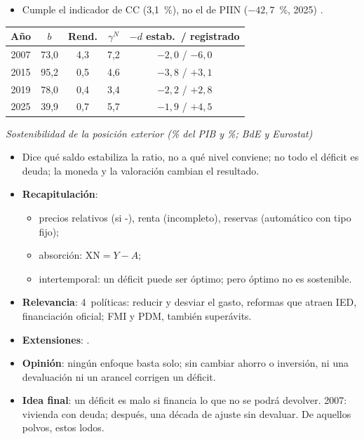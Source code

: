 \documentclass{article}
\begin{document}
\begin{columnas}
\begin{itemize}
\item Cumple el indicador de CC (3,1~\%), no el de PIIN ($-42{,}7$~\%, 2025)  .
\end{itemize}
{\centering\small
\begin{tabular}{@{}ccccc@{}}
\toprule
Año & $b$ & Rend. & $\gamma^N$ & $-d$ estab.\ / registrado\\
\midrule
2007 & 73,0 & 4,3 & 7,2 & $-2{,}0$ / $-6{,}0$\\
2015 & 95,2 & 0,5 & 4,6 & $-3{,}8$ / $+3{,}1$\\
2019 & 78,0 & 0,4 & 3,4 & $-2{,}2$ / $+2{,}8$\\
2025 & 39,9 & 0,7 & 5,7 & $-1{,}9$ / $+4{,}5$\\
\bottomrule
\end{tabular}\par}
{\centering\footnotesize\color{tceegris}\itshape Sostenibilidad de la posición exterior (\% del PIB y \%; BdE y Eurostat)\par}
\begin{itemize}
\item Dice qué saldo estabiliza la ratio, no a qué nivel conviene; no todo el déficit es deuda; la moneda y la valoración cambian el resultado.
\end{itemize}

\begin{itemize}
\item \textbf{Recapitulación}:
  \begin{itemize}
  \item precios relativos (si -), renta (incompleto), reservas (automático con tipo fijo);
  \item absorción: $\mathrm{XN}=Y-A$;
  \item intertemporal: un déficit puede ser óptimo; pero óptimo no es sostenible.
  \end{itemize}
\item \textbf{Relevancia}: 4~políticas: reducir y desviar el gasto, reformas que atraen IED, financiación oficial; FMI y PDM, también superávits.
\item \textbf{Extensiones}:       .
\item \textbf{Opinión}: ningún enfoque basta solo; sin cambiar ahorro o inversión, ni una devaluación ni un arancel corrigen un déficit.
\item \textbf{Idea final}: un déficit es malo si financia lo que no se podrá devolver. 2007: vivienda con deuda; después, una década de ajuste sin devaluar. De aquellos polvos, estos lodos.
\end{itemize}


\end{columnas}
\end{document}
